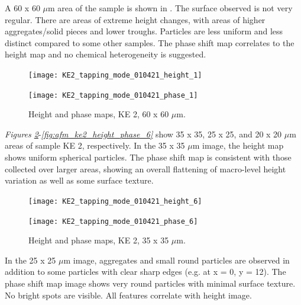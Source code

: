 A 60 x 60 $\mu$m area of the sample is shown in . The surface observed is not very regular. There are areas of extreme height changes, with areas of higher aggregates/solid pieces and lower troughs. Particles are less uniform and less distinct compared to some other samples. The phase shift map correlates to the height map and no chemical heterogeneity is suggested. 

\begin{figure}[H]
\centering
\begin{minipage}{.45\textwidth}
  \centering
  \texttt{[image: KE2\_tapping\_mode\_010421\_height\_1]}
\end{minipage}
\begin{minipage}{.45\textwidth}
  \centering
  \texttt{[image: KE2\_tapping\_mode\_010421\_phase\_1]}
\end{minipage}
\caption[Height and phase maps, KE 2]{Height and phase maps, KE 2, 60 x 60 $\mu$m.}
\label{fig:afm_ke2_height_phase_3}
\end{figure}

\textit{Figures \ref{fig:afm_ke2_height_phase_4}}-\textit{\ref{fig:afm_ke2_height_phase_6}} show 35 x 35, 25 x 25, and 20 x 20 $\mu$m areas of sample KE 2, respectively. In the 35 x 35 $\mu$m image, the height map shows uniform spherical particles. The phase shift map is consistent with those collected over larger areas, showing an overall flattening of macro-level height variation as well as some surface texture.

\begin{figure}[H]
\centering
\begin{minipage}{.45\textwidth}
  \centering
  \texttt{[image: KE2\_tapping\_mode\_010421\_height\_6]}
\end{minipage}
\begin{minipage}{.45\textwidth}
  \centering
  \texttt{[image: KE2\_tapping\_mode\_010421\_phase\_6]}
\end{minipage}
\caption[Height and phase maps, KE 2]{Height and phase maps, KE 2, 35 x 35 $\mu$m.}
\label{fig:afm_ke2_height_phase_4}
\end{figure}

In the 25 x 25 $\mu$m image, aggregates and small round particles are observed in addition to some particles with clear sharp edges (e.g. at x = 0, y = 12). The phase shift map image shows very round particles with minimal surface texture. No bright spots are visible. All features correlate with height image. 

